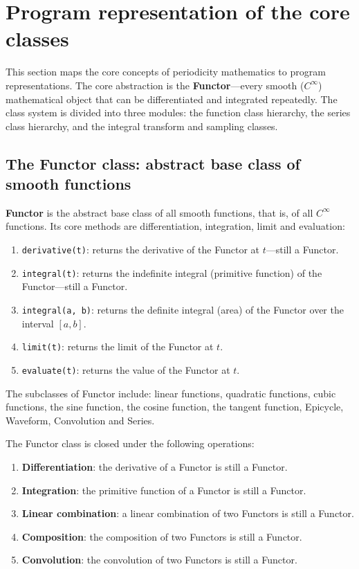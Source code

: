 \section{Program representation of the core classes}

This section maps the core concepts of periodicity mathematics to program representations. The core abstraction is the \textbf{Functor}---every smooth ($C^\infty$) mathematical object that can be differentiated and integrated repeatedly. The class system is divided into three modules: the function class hierarchy, the series class hierarchy, and the integral transform and sampling classes.

\subsection{The Functor class: abstract base class of smooth functions}

\begin{definition}\label{def:functor_class}
\textbf{Functor} is the abstract base class of all smooth functions, that is, of all $C^\infty$ functions. Its core methods are differentiation, integration, limit and evaluation:
\begin{enumerate}[label=(\roman*)]
    \item \texttt{derivative(t)}: returns the derivative of the Functor at $t$---still a Functor.
    \item \texttt{integral(t)}: returns the indefinite integral (primitive function) of the Functor---still a Functor.
    \item \texttt{integral(a, b)}: returns the definite integral (area) of the Functor over the interval $[a,b]$.
    \item \texttt{limit(t)}: returns the limit of the Functor at $t$.
    \item \texttt{evaluate(t)}: returns the value of the Functor at $t$.
\end{enumerate}
The subclasses of Functor include: linear functions, quadratic functions, cubic functions, the sine function, the cosine function, the tangent function, Epicycle, Waveform, Convolution and Series.
\end{definition}

\begin{property}\label{prop:functor_closure}
The Functor class is closed under the following operations:
\begin{enumerate}[label=(\roman*)]
    \item \textbf{Differentiation}: the derivative of a Functor is still a Functor.
    \item \textbf{Integration}: the primitive function of a Functor is still a Functor.
    \item \textbf{Linear combination}: a linear combination of two Functors is still a Functor.
    \item \textbf{Composition}: the composition of two Functors is still a Functor.
    \item \textbf{Convolution}: the convolution of two Functors is still a Functor.
\end{enumerate}
\end{property}

